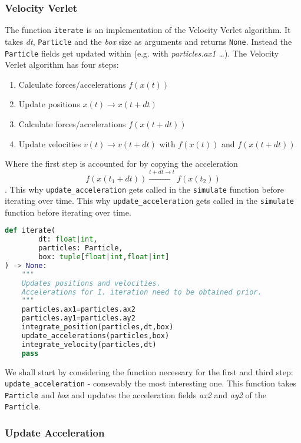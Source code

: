 \documentclass{article}
\begin{document}
\subsubsection{Velocity Verlet}
The function \texttt{iterate} is an implementation of the Velocity Verlet algorithm. It takes \textit{dt}, \texttt{Particle} and the \textit{box} size as arguments and returns \texttt{None}. Instead the \texttt{Particle} fields get updated within (e.g. with \textit{particles.ax1 \dots}). The Velocity Verlet algorithm has four steps:
\begin{enumerate}
    \item Calculate forces/accelerations $f(x(t))$ 
    \item Update positions $x(t) \rightarrow x(t+dt)$ 
    \item Calculate forces/accelerations $f(x(t+dt))$ 
    \item Update velocities $v(t) \rightarrow v(t+dt)$ with $f(x(t))$ and $f(x(t+dt))$
\end{enumerate} 
Where the first step is accounted for by copying the acceleration $$f(x(t_1+dt)) \overset{t+dt \longrightarrow t}{\rightarrow}f(x(t_2))$$. This why \texttt{update\_acceleration} gets called in the \texttt{simulate} function before iterating over time. This why \texttt{update\_acceleration} gets called in the \texttt{simulate} function before iterating over time.
\pagebreak
\begin{lstlisting}[language=Python, caption=Iterates the positions by Velocity Verlet]
def iterate(
        dt: float|int,
        particles: Particle,
        box: tuple[float|int,float|int]
) -> None:
    """
    Updates positions and velocities. 
    Accelerations for 1. iteration need to be obtained prior. 
    """
    particles.ax1=particles.ax2
    particles.ay1=particles.ay2
    integrate_position(particles,dt,box)
    update_accelerations(particles,box)
    integrate_velocity(particles,dt)
    pass
\end{lstlisting}
\pagebreak
We shall start by considering the function necessary for the first and third step: \texttt{update\_acceleration} - consevably the most interesting one. This function takes \texttt{Particle} and \textit{box} and updates the acceleration fields \textit{ax2} and \textit{ay2} of the \texttt{Particle}. 

\subsubsection{Update Acceleration}
\end{document}
